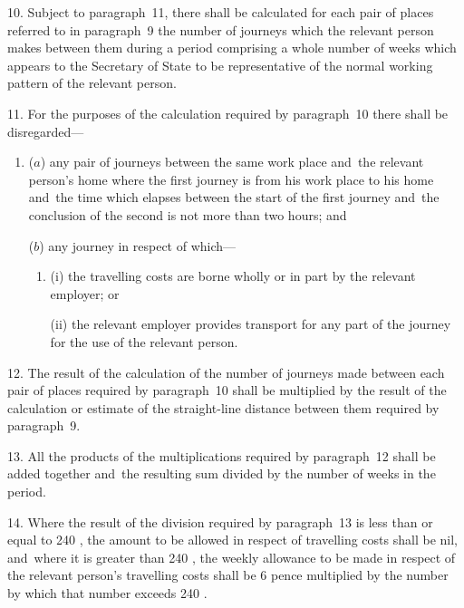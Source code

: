 \documentclass[12pt,a4paper]{article}
\begin{document}
\medskip

10.  Subject to paragraph~11, there shall be calculated for each pair of places referred to in paragraph~9 the number of journeys which the relevant person makes between them during a period comprising a whole number of weeks which appears to the 
Secretary of State  %
to be representative of the normal working pattern of the relevant person.


\medskip

11.  For the purposes of the calculation required by paragraph~10 there shall be disregarded—
\begin{enumerate}\item[]
($a$) any pair of journeys between the same work place and~the relevant person’s home where the first journey is from his work place to his home and~the time which elapses between the start of the first journey and~the conclusion of the second is not more than two hours; and

($b$) any journey in respect of which—
\begin{enumerate}\item[]
(i) the travelling costs are borne wholly or in part by the relevant employer; or

(ii) the relevant employer provides transport for any part of the journey for the use of the relevant person.
\end{enumerate}
\end{enumerate}

\medskip

12.  The result of the calculation of the number of journeys made between each pair of places required by paragraph~10 shall be multiplied by the result of the calculation or estimate of the straight-line distance between them required by paragraph~9.

\medskip

13.  All the products of the multiplications required by paragraph~12 shall be added together and~the resulting sum divided by the number of weeks in the period.

\medskip

14.  Where the result of the division required by paragraph~13 is less than or equal to 
240%
, the amount to be allowed in respect of travelling costs shall be nil, and~where it is greater than 
240%
, the weekly allowance to be made in respect of the relevant person’s travelling costs shall be 
6 pence  %
multiplied by the number by which that number exceeds 
240%
.
\end{document}

